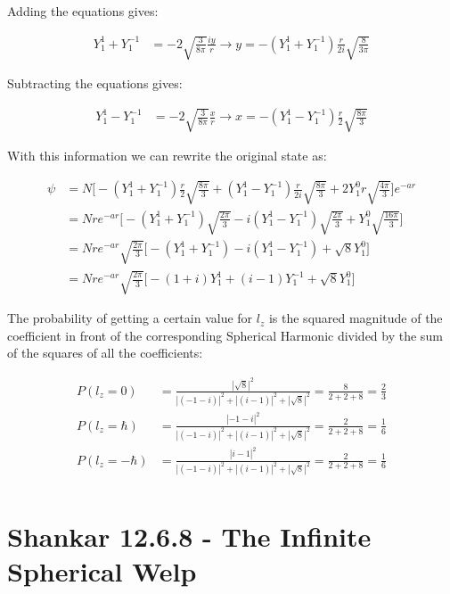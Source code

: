 \documentclass[paper=a4, fontsize=11pt]{scrartcl} %
\numberwithin{equation}{section} %
\numberwithin{figure}{section} %
\numberwithin{table}{section} %
\begin{document}
Adding the equations gives:

\begin{align}
Y^1_1 + Y^{-1}_1 &= -2 \sqrt{\frac{3}{8 \pi}} \frac{iy}{r} \rightarrow y =  -(Y^1_1 + Y^{-1}_1) \frac{r}{2i} \sqrt{\frac{8}{3 \pi}}
\end{align}

Subtracting the equations gives:

\begin{align}
Y^1_1 - Y^{-1}_1 &= -2 \sqrt{\frac{3}{8 \pi}} \frac{x}{r} \rightarrow x = -(Y^1_1 - Y^{-1}_1)\frac{r}{2} \sqrt{\frac{8 \pi}{3}} 
\end{align}

With this information we can rewrite the original state as: 

\begin{align}
\psi &= N \bigg[ -(Y^1_1 + Y^{-1}_1) \frac{r}{2} \sqrt{\frac{8 \pi}{3}} + (Y^1_1 - Y^{-1}_1) \frac{r}{2i} \sqrt{\frac{8 \pi}{3}} + 2 Y^0_1 r \sqrt{\frac{4 \pi}{3}}  \bigg]e^{-a r} \\  
&= N r e^{-a r} \bigg[-(Y^1_1 + Y^{-1}_1) \sqrt{\frac{2 \pi}{3}} - i(Y^1_1 - Y^{-1}_1) \sqrt{\frac{2 \pi}{3}} + Y^0_1 \sqrt{\frac{16 \pi}{3}} \bigg] \\
&= N r e^{-a r} \sqrt{\frac{2 \pi}{3}} \bigg[-(Y^1_1 + Y^{-1}_1) -i (Y^1_1 - Y^{-1}_1) + \sqrt{8}Y^0_1 \bigg] \\ 
&= N r e^{-a r} \sqrt{\frac{2 \pi}{3}} \bigg[-(1 + i)Y^1_1 + (i - 1)Y^{-1}_1 + \sqrt{8} Y^0_1 \bigg]
\end{align}

The probability of getting a certain value for $l_z$ is the squared magnitude of the coefficient in front of the corresponding Spherical Harmonic divided by the sum of the squares of all the coefficients:

\begin{align}
P(l_z = 0) &= \frac{|\sqrt{8}|^2}{|(-1 - i)|^2 + |(i - 1)|^2 + |\sqrt{8}|^2} = \frac{8}{2 + 2 + 8} = \frac{2}{3} \\ 
P(l_z = \hbar) &= \frac{|-1 - i|^2}{|(-1 - i)|^2 + |(i - 1)|^2 + |\sqrt{8}|^2} = \frac{2}{2 + 2 + 8} = \frac{1}{6} \\
P(l_z = -\hbar) &= \frac{|i - 1|^2}{|(-1 - i)|^2 + |(i - 1)|^2 + |\sqrt{8}|^2} = \frac{2}{2 + 2 + 8} = \frac{1}{6} \\
\end{align}

\section{Shankar 12.6.8 - The Infinite Spherical Welp}
\end{document}
